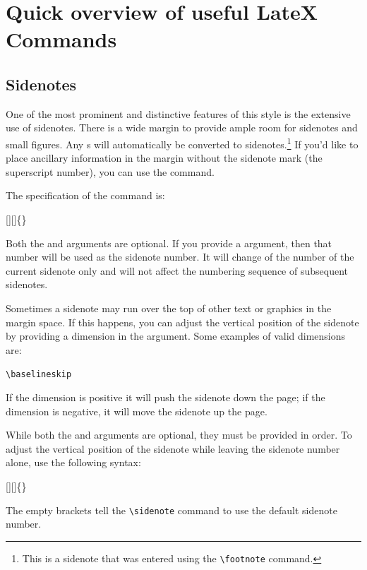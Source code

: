 
\chapter*{Quick overview of useful LateX Commands}



\section{Sidenotes}\label{sec:sidenotes}
One of the most prominent and distinctive features of this style is the
extensive use of sidenotes.  There is a wide margin to provide ample room
for sidenotes and small figures.  Any s will automatically
be converted to sidenotes.\footnote{This is a sidenote that was entered
using the \texttt{\textbackslash footnote} command.}  If you'd like to place ancillary
information in the margin without the sidenote mark (the superscript
number), you can use the  command.

The specification of the  command is:
\begin{docspec}
[][]\{\}
\end{docspec}

Both the  and  arguments are optional.  If you
provide a  argument, then that number will be used as the
sidenote number.  It will change of the number of the current sidenote only and
will not affect the numbering sequence of subsequent sidenotes.

Sometimes a sidenote may run over the top of other text or graphics in the
margin space.  If this happens, you can adjust the vertical position of the
sidenote by providing a dimension in the  argument.  Some
examples of valid dimensions are:
\begin{docspec}
  \ttfamily 1.0in \qquad 2.54cm \qquad 254mm \Verb|\baselineskip|
\end{docspec}
If the dimension is positive it will push the sidenote down the page; if the
dimension is negative, it will move the sidenote up the page.

While both the  and  arguments are optional, they
must be provided in order.  To adjust the vertical position of the sidenote
while leaving the sidenote number alone, use the following syntax:
\begin{docspec}
  [][]\{\}
\end{docspec}
The empty brackets tell the \Verb|\sidenote| command to use the default
sidenote number.

